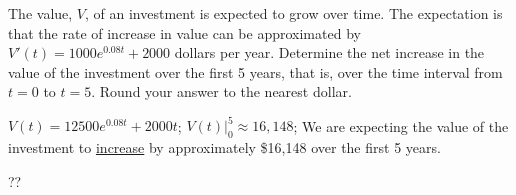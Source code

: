 \begin{example}
The value, $V$, of an investment is expected to grow over time.  The expectation is that the rate of increase in value can be approximated  by $V'(t)=1000e^{0.08t}+2000$ dollars per year.  Determine the net increase in the value of the investment over the first 5 years, that is, over the time interval from $t=0$ to $t=5$. 	Round your answer to the nearest dollar.	
    \begin{sol}
    $V(t)=12500e^{0.08t}+2000t$; $V(t)\big|_0^5\approx 16,148$;  We are expecting the value of the investment to \underline{increase} by approximately \$16,148 over the first 5 years.
    \end{sol}
    \begin{solL}
    ??
    
    \end{solL}
    
\end{example}
\newpage
